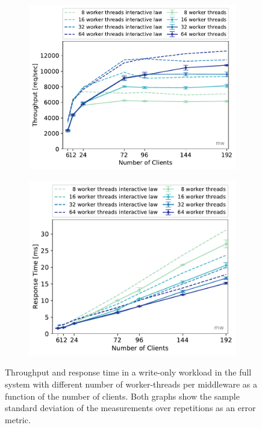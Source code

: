 \documentclass[report.tex]{subfiles}
\begin{document}
\begin{figure}
	\begin{subfigure}[b]{.49\linewidth}
		\centering
		\includegraphics[width=\linewidth]{data/exp41_wo_tp_nc_w.pdf}
	\end{subfigure}\hfill
	\begin{subfigure}[b]{.49\linewidth}
		\centering
		\includegraphics[width=\linewidth]{data/exp41_wo_rt_nc_w.pdf}
	\end{subfigure}%
	\caption{Throughput and response time in a write-only workload in the full system with different number of worker-threads per middleware as a function of the number of clients. Both graphs show the sample standard deviation of the measurements over repetitions as an error metric.}\label{exp41_tp_rt_nc}
\end{figure}
\end{document}
